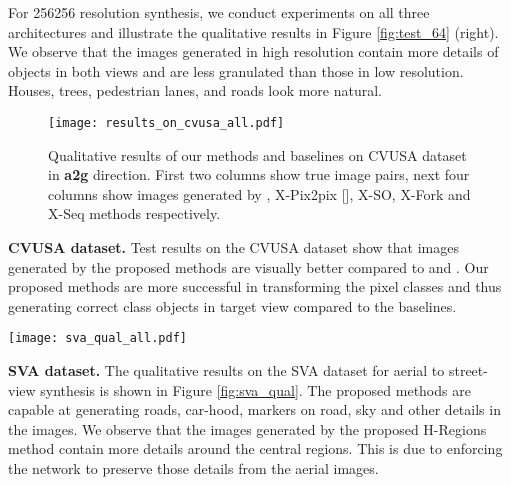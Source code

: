 \documentclass[times,twocolumn,final,authoryear]{elsarticle_modified}
\begin{document}
For 256256 resolution synthesis, we conduct experiments on all three architectures and illustrate the qualitative results in Figure \ref{fig:test_64} (right). We observe that the images generated in high resolution contain more details of objects in both views and are less granulated than those in low resolution. Houses, trees, pedestrian lanes, and roads look more natural. 


\begin{figure}
\centering
\texttt{[image: results\_on\_cvusa\_all.pdf]}
\vspace{-18pt}
\caption{\small \label{fig:cvusa}Qualitative results of our methods and baselines on CVUSA dataset in \textbf{a2g} direction. First two columns show true image pairs, next four columns show images generated by \cite{zhai2017crossview}, X-Pix2pix [\cite{pix2pix2017}], X-SO, X-Fork and X-Seq methods respectively.}
\end{figure} 
 



 
\noindent \textbf{CVUSA dataset.} 
Test results on the CVUSA dataset show that images generated by the proposed methods are visually better compared to \cite{zhai2017crossview} and \cite{pix2pix2017}. Our proposed methods are more successful in transforming the pixel classes and thus generating correct class objects in target view compared to the baselines.


 
 
\begin{figure*}
\centering
\texttt{[image: sva\_qual\_all.pdf]}
\vspace{-5pt}
\caption{\small \label{fig:sva_qual} Example images generated by different methods in \textbf{a2g} direction for \textbf{SVA} dataset. }
\end{figure*}


\noindent \textbf{SVA dataset.}
The qualitative results on the SVA dataset for aerial to street-view synthesis is shown in Figure \ref{fig:sva_qual}. The proposed methods are capable at generating roads, car-hood, markers on road, sky and other details in the images. We observe that the images generated by the proposed H-Regions method contain more details around the central regions. This is due to enforcing the network to preserve those details from the aerial images.







 
 
\end{document}
